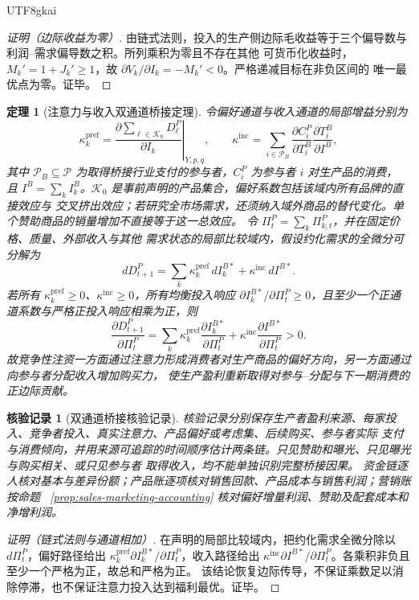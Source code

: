 \documentclass[12pt,a4paper,openany]{report}
\newtheorem{theorem}{定理}[chapter]
\newtheorem{Certificate}{核验记录}[chapter]
\newcommand{\Part}{\mathcal P}
\begin{document}
\begin{CJK*}{UTF8}{gkai}
\begin{proof}[证明（边际收益为零）]
由链式法则，投入的生产侧边际毛收益等于三个偏导数与利润--需求偏导数之积。所列乘积为零且不存在其他
可货币化收益时，\(M_k'=1+J_k'\ge1\)，故 \(\partial V_k/\partial I_k=-M_k'<0\)。严格递减目标在非负区间的
唯一最优点为零。证毕。
\end{proof}

\begin{theorem}[注意力与收入双通道桥接定理]
\label{thm:dual-channel-bridge}
令偏好通道与收入通道的局部增益分别为
\[
  \kappa_{k}^{\mathrm{pref}}
  =
  \left.
  \frac{\partial\sum_{\ell\in\mathcal K_0}D_\ell^P}{\partial I_k}
  \right|_{Y,p,q},
  \qquad
  \kappa^{\mathrm{inc}}
  =\sum_{i\in\Part_B}
  \frac{\partial C_i^P}{\partial T_i^B}
  \frac{\partial T_i^B}{\partial I^B},
\]
其中 \(\Part_B\subseteq\Part\) 为取得桥接行业支付的参与者，\(C_i^P\) 为参与者 \(i\) 对生产品的消费，
且 \(I^B=\sum_k I_k^B\)。\(\mathcal K_0\) 是事前声明的产品集合，偏好系数包括该域内所有品牌的直接效应与
交叉挤出效应；若研究全市场需求，还须纳入域外商品的替代变化。单个赞助商品的销量增加不直接等于这一总效应。
令 \(\Pi_t^P=\sum_k\Pi_{k,t}^P\)，并在固定价格、质量、外部收入与其他
需求状态的局部比较域内，假设约化需求的全微分可分解为
\[
  dD_{t+1}^P
  =\sum_k\kappa_k^{\mathrm{pref}}\,dI_k^{B*}
  +\kappa^{\mathrm{inc}}\,dI^{B*}.
\]
若所有 \(\kappa_k^{\mathrm{pref}}\ge0\)、\(\kappa^{\mathrm{inc}}\ge0\)，所有均衡投入响应
\(\partial I_k^{B*}/\partial\Pi_t^P\ge0\)，且至少一个正通道系数与严格正投入响应相乘为正，则
\[
  \frac{\partial D_{t+1}^P}{\partial\Pi_t^P}
  =
  \sum_k\kappa_k^{\mathrm{pref}}
  \frac{\partial I_k^{B*}}{\partial\Pi_t^P}
  +\kappa^{\mathrm{inc}}
  \frac{\partial I^{B*}}{\partial\Pi_t^P}
  >0.
\]
故竞争性注资一方面通过注意力形成消费者对生产商品的偏好方向，另一方面通过向参与者分配收入增加购买力，
使生产盈利重新取得对参与--分配与下一期消费的正边际贡献。
\end{theorem}

\begin{Certificate}[双通道桥接核验记录]
核验记录分别保存生产者盈利来源、每家投入、竞争者投入、真实注意力、产品偏好或考虑集、后续购买、参与者实际
支付与消费倾向，并用来源可追踪的时间顺序估计两条链。只见赞助和曝光、只见曝光与购买相关、或只见参与者
取得收入，均不能单独识别完整桥接因果。
资金链逐人核对基本与差异份额；产品账逐项核对销售回款、产品成本与销售利润；营销账按命题
~\ref{prop:sales-marketing-accounting} 核对偏好增量利润、赞助及配套成本和净增利润。
\end{Certificate}

\begin{proof}[证明（链式法则与通道相加）]
在声明的局部比较域内，把约化需求全微分除以 \(d\Pi_t^P\)，偏好路径给出
\(\kappa_k^{\mathrm{pref}}\partial I_k^{B*}/\partial\Pi_t^P\)，收入路径给出
\(\kappa^{\mathrm{inc}}\partial I^{B*}/\partial\Pi_t^P\)。各乘积非负且至少一个严格为正，故总和严格为正。
该结论恢复边际传导，不保证乘数足以消除停滞，也不保证注意力投入达到福利最优。证毕。
\end{proof}


\end{CJK*}
\end{document}
